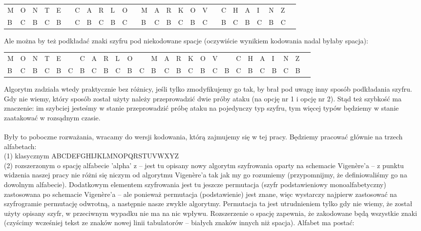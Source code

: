 \documentclass[a4paper]{article}
\theoremstyle{defn}
\theoremstyle{theorem}
\theoremstyle{lemma}
\theoremstyle{cor}
\theoremstyle{fact}
\begin{document}
\begin{center}\begin{tabular}{|p{1.5mm}|p{1.5mm}|p{1.5mm}|p{1.5mm}|p{1.5mm}|p{1.5mm}|p{1.5mm}|p{1.5mm}|p{1.5mm}|p{1.5mm}|p{1.5mm}|p{1.5mm}|p{1.5mm}|p{1.5mm}|p{1.5mm}|p{1.5mm}|p{1.5mm}|p{1.5mm}|p{1.5mm}|p{1.5mm}|p{1.5mm}|p{1.5mm}|p{1.5mm}|p{1.5mm}|p{1.5mm}|p{1.5mm}|}
    M & O & N & T & E & & C & A & R & L & O & & M & A & R & K & O & V & & C & H & A & I & N & Z \\
    B & C & B & C & B & & C & B & C & B & C & & B & C & B & C & B & C & & B & C & B & C & B & C 
\end{tabular}
\end{center}
Ale można by też podkładać znaki szyfru pod niekodowane spacje (oczywiście wynikiem kodowania nadal byłaby spacja):\\
\begin{center}\begin{tabular}{|p{1.5mm}|p{1.5mm}|p{1.5mm}|p{1.5mm}|p{1.5mm}|p{1.5mm}|p{1.5mm}|p{1.5mm}|p{1.5mm}|p{1.5mm}|p{1.5mm}|p{1.5mm}|p{1.5mm}|p{1.5mm}|p{1.5mm}|p{1.5mm}|p{1.5mm}|p{1.5mm}|p{1.5mm}|p{1.5mm}|p{1.5mm}|p{1.5mm}|p{1.5mm}|p{1.5mm}|p{1.5mm}|p{1.5mm}|}
    M & O & N & T & E & & C & A & R & L & O & & M & A & R & K & O & V & & C & H & A & I & N & Z \\
    B & C & B & C & B & C & B & C & B & C & B & C & B & C & B & C & B & C & B & C & B & C & B & C & B 
\end{tabular}
\end{center}
Algorytm zadziała wtedy praktycznie bez różnicy, jeśli tylko zmodyfikujemy go tak, by brał pod uwagę inny sposób podkładania szyfru. Gdy nie wiemy, który sposób został użyty należy przeprowadzić dwie próby ataku (na opcję nr 1 i opcję nr 2). Stąd też szybkość ma znaczenie: im szybciej jesteśmy w stanie przeprowadzić próbę ataku na pojedynczy typ szyfru, tym więcej typów będziemy w stanie zaatakować w rozsądnym czasie.\\\\
Były to poboczne rozważania, wracamy do wersji kodowania, którą zajmujemy się w tej pracy.
Będziemy pracować głównie na trzech alfabetach:\\
(1) klasycznym ABCDEFGHIJKLMNOPQRSTUVWXYZ\\
(2) rozszerzonym o spację alfabecie 'alpha' z \cite{alphaqwerty} – jest tu opisany nowy algorytm szyfrowania oparty na schemacie Vigenère'a – z punktu widzenia naszej pracy nie różni się niczym od algorytmu Vigenère'a tak jak my go rozumiemy (przypomnijmy, że definiowaliśmy go na dowolnym alfabecie). Dodatkowym elementem szyfrowania jest tu jeszcze permutacja (szyfr podstawieniowy monoalfabetyczny) zastosowana po schemacie Vigenère'a – ale ponieważ permutacja (podstawienie) jest znane, więc wystarczy najpierw zastosować na szyfrogramie permutację odwrotną, a następnie nasze zwykłe algorytmy. Permutacja ta jest utrudnieniem tylko gdy nie wiemy, że został użyty opisany szyfr, w przeciwnym wypadku nie ma na nic wpływu. Rozszerzenie o spację zapewnia, że zakodowane będą wszystkie znaki (czyścimy wcześniej tekst ze znaków nowej linii tabulatorów – białych znaków innych niż spacja). Alfabet ma postać:\\
\end{document}
